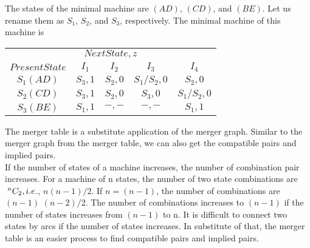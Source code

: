 \documentclass[9pt]{beamer}
\begin{document}
\begin{frame}

\hspace*{0.2cm} The states of the minimal machine are $(AD)$, $(CD)$, and $(BE)$. Let us rename them as $S_1$, $S_2$, and $S_3$,
respectively. The minimal machine of this machine is\\

\pause
\begin{center}
\begin{tabular}{ccccc}
 \hline

 \hline

 \hline

 \hline

\multicolumn{5}{c}{$Next State, z$}\\
 \cline{2-5}
       $Present State$   &    $I_1$      &    $I_2$        &        $I_3$   &     $I_4$      \\
 \hline
       $S_1(AD)$         &    $S_3, 1$   &     $S_2, 0$    &     $S_1/S_2, 0$   &   $S_2, 0$        \\
       $S_2(CD)$         &    $S_3, 1$   &     $S_2, 0$    &     $S_3, 0$       &   $S_1/S_2, 0$    \\
       $S_3(BE)$         &    $S_1, 1$   &     $-, -$      &     $-, -$         &   $S_1, 1$        \\
 \hline

 \hline

 \hline

 \hline
\end{tabular}
\end{center}
\end{frame}

\begin{frame}

\vspace*{0.2cm}
The merger table is a substitute application of the merger graph. Similar to the merger graph from the
merger table, we can also get the compatible pairs and implied pairs.\\
\hspace*{0.5cm} If the number of states of a machine increases, the number of combination pair increases. For a machine of n states, the number of two state combinations are $\textcolor[rgb]{1.00,1.00,1.00}{.}^nC_2, i.e$., $n(n-1)/2$. If $n = (n-1)$, the number of combinations are $(n-1)$ $(n-2)/2$. The number of combinations increases to $(n-1)$ if the number of states increases from $(n-1)$ to n. It is difficult to connect two states by arcs if the number of states increases. In substitute of that, the merger table is an easier process to find compatible pairs and implied pairs.\\

\vspace*{0.5cm}
\end{frame}
\end{document}
